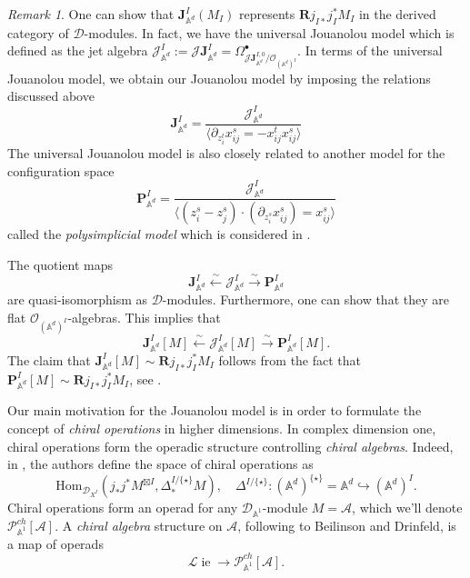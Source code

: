 \documentclass[11pt]{amsart}
\theoremstyle{definition}
\theoremstyle{remark}
\newtheorem{rem}[thm]{Remark}
\numberwithin{equation}{section}
\newcommand{\R}{\mathbf{R}}
\renewcommand{\AA}{\mathbb{A}}
\newcommand{\op}{\operatorname}
\newcommand{\cA}{\mathcal{A}}
\newcommand{\cP}{\mathcal{P}}
\begin{document}
\begin{rem}
One can show that $\mathbf{J}_{\mathbb{A}^d}^{{I}}(M_{{I}})$ represents $\R j_{I*}j^*_IM_{I}$ in the derived category
of $\mathcal{D}$-modules. In fact, we have the universal Jouanolou model \cite[4.1.3. (ii)]{BD} which
is defined as the jet algebra $\mathcal{J}_{\mathbb{A}^d}^{{I}}:=\mathscr{J}\mathbf{J}_{\mathbb{A}^d}^{{I}}
=\Omega^{\bullet}_{\mathscr{J}\mathbf{J}_{\mathbb{A}^d}^{{I},0}/\mathcal{O}_{(\mathbb{A}^d)^I}}$.
In terms of the universal Jouanolou model, we obtain our Jouanolou model by imposing the relations discussed above
\[
\mathbf{J}_{\mathbb{A}^d}^{{I}}=\frac{\mathcal{J}_{\mathbb{A}^d}^{{I}}}{\langle \partial_{z^t_i}x^s_{ij}=-x^t_{ij}
x^s_{ij}\rangle}
\]
The universal Jouanolou model is also closely related to another model for the configuration space
\[
  \mathbf{P}_{\mathbb{A}^d}^{{I}}=\frac{\mathcal{J}_{\mathbb{A}^d}^{{I}}}{\langle (z^s_i-z^s_j)\cdot(\partial_{z^s_i}x^s_{ij})=x^s_{ij}\rangle}
  \]
  called the \textit{polysimplicial model} which is considered in \cite{FGY}.

The quotient maps
\[
\mathbf{J}_{\mathbb{A}^d}^{{I}}\xleftarrow{\sim}\mathcal{J}_{\mathbb{A}^d}^{{I}}\xrightarrow{\sim}\mathbf{P}_{\mathbb{A}^d}^{{I}}
\]
are quasi-isomorphism as $\mathcal{D}$-modules.
Furthermore, one can show that they are flat $\mathcal{O}_{(\mathbb{A}^d)^I}$-algebras. This implies that
$$
\mathbf{J}_{\mathbb{A}^d}^{{I}}[M]\xleftarrow{\sim}\mathcal{J}_{\mathbb{A}^d}^{{I}}[M]\xrightarrow{\sim}\mathbf{P}_{\mathbb{A}^d}^{{I}}[M].
$$
The claim that  $\mathbf{J}_{\mathbb{A}^d}^{{I}}[M]\sim \R j_{I*}j^*_IM_{I}$ follows from the fact that $\mathbf{P}
_{\mathbb{A}^d}^{{I}}[M]\sim \mathbf{R}j_{I*}j^*_IM_{I}$, see \cite{FGY}.
  \end{rem}

  Our main motivation for the Jouanolou model is in order to formulate the concept of \textit{chiral operations} in
  higher dimensions.
  In complex dimension one, chiral operations form the operadic structure controlling \textit{chiral
  algebras}.
  Indeed, in \cite{BD}, the authors define the space of chiral operations as
    $$
    \mathrm{Hom}_{\mathcal{D}_{X^{{I}}}}\left(j_{*}j^*M^{\boxtimes{I}},\Delta^{I/\{\star\}} _*M\right),\quad \Delta^{I/\{\star\}} \colon (\mathbb{A}^d)^{\{\star\}} = \mathbb{A}^d \hookrightarrow(\mathbb{A}^d)^{I}.
    $$
    Chiral operations form an operad for any $\mathcal{D}_{\mathbb{A}^1}$-module $M=\cA$, which we'll denote $\mathcal{P}
    _{\AA^1}^{ch}[\cA]$.
    A \textit{chiral algebra} structure on $\cA$, following to Beilinson and Drinfeld, is a map of operads
    \begin{equation}\label{}
      \mathcal{L}\!\op{ie} \to \cP_{\AA^1}^{ch}[\cA] .
    \end{equation}
\end{document}
